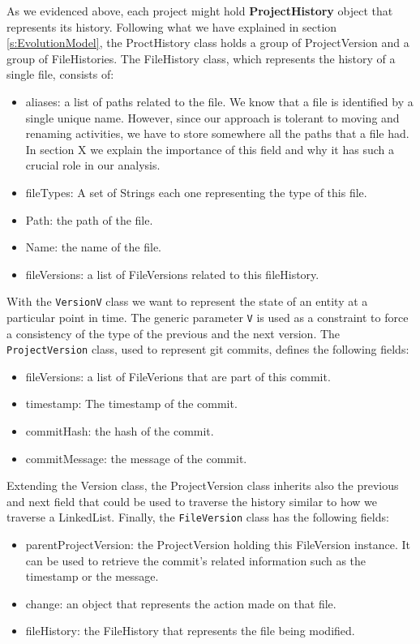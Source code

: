As we evidenced above, each project might hold \textbf{ProjectHistory} object that represents its history. 
Following what we have explained in section \ref{s:EvolutionModel}, the ProctHistory class holds a group of ProjectVersion and a group of FileHistories. The FileHistory class, which represents the history of a single file, consists of:
\begin{itemize}
    \item aliases: a list of paths related to the file. We know that a file is identified by a single unique name. However, since our approach is tolerant to moving and renaming activities, we have to store somewhere all the paths that a file had. In section X we explain the importance of this field and why it has such a crucial role in our analysis. 
    \item fileTypes: A set of Strings each one representing the type of this file. 
    \item Path: the path of the file.
    \item Name: the name of the file.
    \item fileVersions: a list of FileVersions related to this fileHistory. 
\end{itemize}
With the \texttt{VersionV} class we want to represent the state of an entity at a particular point in time. 
The generic parameter \texttt{V} is used as a constraint to force a consistency of the type of the previous and the next version. 
The \texttt{ProjectVersion} class, used to represent git commits, defines the following fields: 
\begin{itemize}
    \item fileVersions: a list of FileVerions that are part of this commit.
    \item timestamp: The timestamp of the commit. 
    \item commitHash: the hash of the commit. 
    \item commitMessage: the message of the commit.
\end{itemize}
Extending the Version class, the ProjectVersion class inherits also the previous and next field that could be used to traverse the history similar to how we traverse a LinkedList. 
Finally, the \texttt{FileVersion} class has the following fields:
\begin{itemize}
    \item parentProjectVersion: the ProjectVersion holding this FileVersion instance. It can be used to retrieve the commit's related information such as the timestamp or the message. 
    \item change: an object that represents the action made on that file. 
    \item fileHistory: the FileHistory that represents the file being modified. 
\end{itemize}

